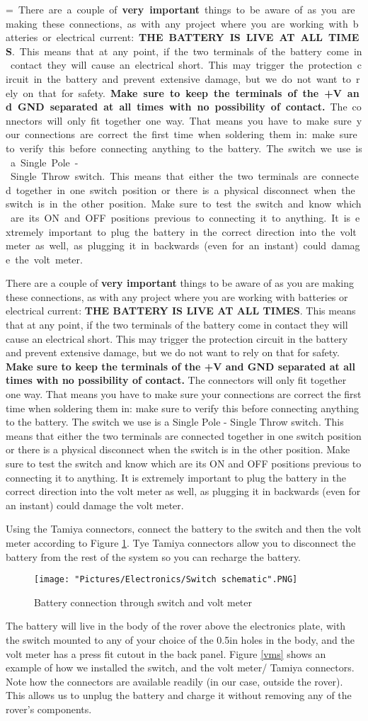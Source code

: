 \documentclass[12pt]{article}
\makeatletter
\newcommand{\mybox}[1]{%
  \setbox0=\hbox{#1}%
  \setlength{\@tempdima}{\dimexpr\wd0+13pt}%
  \begin{tcolorbox}[colframe=mycolor,boxrule=0.5pt,arc=4pt,
      left=6pt,right=6pt,top=6pt,bottom=6pt,boxsep=0pt,width=0.95\textwidth]
    #1
  \end{tcolorbox}
}
\makeatother
\begin{document}
\mybox{
There are a couple of \textbf{very important} things to be aware of as you are making these connections, as with any project where you are working with batteries or electrical current:
\newline
\noindent \textbf{THE BATTERY IS LIVE AT ALL TIMES}. This means that at any point, if the two terminals of the battery come in contact they will cause an electrical short. This may trigger the protection circuit in the battery and prevent extensive damage, but we do not want to rely on that for safety. \textbf{Make sure to keep the terminals of the +V and GND separated at all times with no possibility of contact.}
\newline
\noindent The connectors will only fit together one way. That means you have to make sure your connections are correct the first time when soldering them in: make sure to verify this before connecting anything to the battery.
\newline
\noindent The switch we use is a Single Pole - Single Throw switch. This means that either the two terminals are connected together in one switch position or there is a physical disconnect when the switch is in the other position. Make sure to test the switch and know which are its ON and OFF positions previous to connecting it to anything.
\newline
\noindent  It is extremely important to plug the battery in the correct direction into the volt meter as well, as plugging it in backwards (even for an instant) could damage the volt meter. 
}

Using the Tamiya connectors, connect the battery to the switch and then the volt meter according to Figure \ref{sw sch}. Tye Tamiya connectors allow you to disconnect the battery from the rest of the system so you can recharge the battery. 

\begin{figure}[H]
  	\centering
    	\texttt{[image: "Pictures/Electronics/Switch schematic".PNG]}
 	\caption{Battery connection through switch and volt meter}
	\label{sw sch}
\end{figure}



The battery will live in the body of the rover above the electronics plate, with the switch mounted to any of your choice of the 0.5in holes in the body, and the volt meter has a press fit cutout in the back panel. Figure \ref{vms} shows an example of how we installed the switch, and the volt meter/ Tamiya connectors. Note how the connectors are available readily (in our case, outside the rover). This allows us to unplug the battery and charge it without removing any of the rover's components. 
\end{document}
